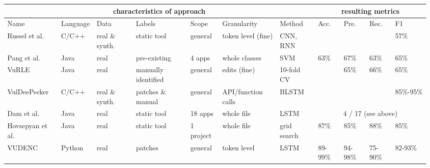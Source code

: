 \documentclass[
a4paper,
pagesize,
pdftex,
12pt,
twoside, %
BCOR=5mm, %
ngerman,
fleqn,
final,
]{scrartcl}
\begin{document}
	\scriptsize
	\begin{tabular}{ | p{1.8cm} | p{1.2cm}|  p{0.7cm}| p{1.4cm} |  p{1.2cm} | p{1.5cm} | p{1.1cm} || p{0.4cm}|p{0.4cm}|p{0.4cm}|p{0.4cm}|  }
		\hline
		\multicolumn{7}{|c||}{characteristics of approach} & \multicolumn{4}{c|}{resulting metrics} \\
		\hline
		Name &  Language & Data & Labels & Scope &Granularity & Method & Acc. & Pre. & Rec. & F1  \\
		\hline
		Russel et al. & C/C++ & real \& synth. & static tool & general & token level (fine) & CNN, RNN &  &   &   &  57\%  \\
		\hline
		Pang et al. & Java & real  & pre-existing  & 4 apps & whole classes & SVM & 63\% & 67\%  & 63\%  & 65\%    \\
		\hline
		VuRLE & Java & real  & manually identified  & general & edits (fine) & 10-fold CV &  & 65\%  & 66\%  & 65\%    \\
		\hline
		VulDeePecker & C/C++ & real \& synth.  & patches \& manual & general & API/function calls & BLSTM &  &   &  & 85\%-95\%    \\
		\hline
		Dam et al. & Java & real &static tool & 18 apps & whole file & LSTM & \multicolumn{4}{c|}{ 4 / 17 (see above)}   \\
		\hline
		Hovsepyan et al. & Java & real  &static tool  & 1 project & whole file & grid search & 87\% & 	85\%  & 88\%  & 85\%   \\
		\hline
		VUDENC & Python & real  &patches& general  & token level & LSTM & 89-99\% & 94-98\% & 75-90\% & 82-93\%   \\
		\hline
		\hline 
	\end{tabular}\\
	\normalsize
	
\end{document}
